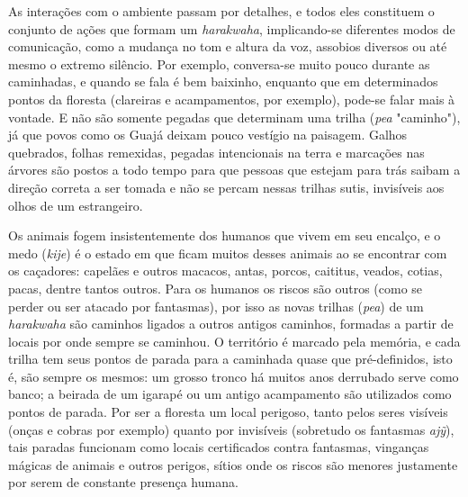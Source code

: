 As interações com o ambiente passam por detalhes, e todos eles
constituem o conjunto de ações que formam um \emph{harakwaha},
implicando-se diferentes modos de comunicação, como a mudança no tom e
altura da voz, assobios diversos ou até mesmo o extremo silêncio. Por
exemplo, conversa-se muito pouco durante as caminhadas, e quando se fala
é bem baixinho, enquanto que em determinados pontos da floresta
(clareiras e acampamentos, por exemplo), pode-se falar mais à vontade. E
não são somente pegadas que determinam uma trilha (\emph{pea}
"caminho"), já que povos como os Guajá deixam pouco vestígio na
paisagem. Galhos quebrados, folhas remexidas, pegadas intencionais na
terra e marcações nas árvores são postos a todo tempo para que pessoas
que estejam para trás saibam a direção correta a ser tomada e não se
percam nessas trilhas sutis, invisíveis aos olhos de um estrangeiro.

Os animais fogem insistentemente dos humanos que vivem em seu encalço, e
o medo (\emph{kije}) é o estado em que ficam muitos desses animais ao se
encontrar com os caçadores: capelães e outros macacos, antas, porcos,
caititus, veados, cotias, pacas, dentre tantos outros. Para os humanos
os riscos são outros (como se perder ou ser atacado por fantasmas), por
isso as novas trilhas (\emph{pea}) de um \emph{harakwaha} são caminhos
ligados a outros antigos caminhos, formadas a partir de locais por onde
sempre se caminhou. O território é marcado pela memória, e cada trilha
tem seus pontos de parada para a caminhada quase que pré-definidos, isto
é, são sempre os mesmos: um grosso tronco há muitos anos derrubado serve
como banco; a beirada de um igarapé ou um antigo acampamento são
utilizados como pontos de parada. Por ser a floresta um local perigoso,
tanto pelos seres visíveis (onças e cobras por exemplo) quanto por
invisíveis (sobretudo os fantasmas \emph{ajỹ}), tais paradas funcionam
como locais certificados contra fantasmas, vinganças mágicas de animais
e outros perigos, sítios onde os riscos são menores justamente por serem
de constante presença humana.

